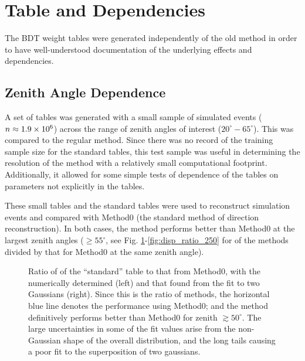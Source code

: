 \documentclass[main.tex]{subfiles}
\begin{document}
\section{\disp Table and \rse Dependencies}
The BDT weight tables were generated independently of the old \disp method in order to have well-understood documentation of the underlying effects and dependencies.

\subsection{Zenith Angle Dependence}
A set of \disp tables was generated with a small sample of simulated events ($n\approx 1.9\times 10^{6}$) across the range of zenith angles of interest ($20^\circ-65^\circ$). This was compared to the regular \disp method. Since there was no record of the training sample size for the standard tables, this test sample was useful in determining the resolution of the \disp method with a relatively small computational footprint. Additionally, it allowed for some simple tests of dependence of the \disp tables on parameters not explicitly in the \disp tables.

These small \disp tables and the standard \disp tables were used to reconstruct simulation events and compared with Method0 (the standard method of direction reconstruction). In both cases, the \disp method performs better than Method0 at the largest zenith angles ($\geq 55^\circ$, see Fig. \ref{fig:olddisp_ratio}-\ref{fig:disp_ratio_250} for \rse of the \disp methods divided by that for Method0 at the same zenith angle).

\begin{figure}[H]
  \begin{center}
      \caption[``standard'' \disp table reconstruction.]{Ratio of \rse of the ``standard'' \disp table to that from Method0, with the numerically determined \rse (left) and that found from the fit to two Gaussians (right). Since this is the ratio of methods, the horizontal blue line denotes the performance using Method0; and the \disp method definitively performs better than Method0 for zenith $\gtrsim50^\circ$. The large uncertainties in some of the fit values arise from the non-Gaussian shape of the overall distribution, and the long tails causing a poor fit to the superposition of two gaussians.}  
      \label{fig:olddisp_ratio}
  \end{center}
\end{figure}
\end{document}
